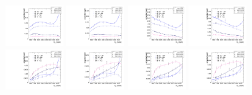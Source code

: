 \begin{figure}[htbp]
  \includegraphics[width=0.2\textwidth]{fig/analysis/paramSignalYield_VBFSig_mu_HP_vbf_DEtaLo.pdf}
  \includegraphics[width=0.2\textwidth]{fig/analysis/paramSignalYield_VBFSig_e_HP_vbf_DEtaLo.pdf}
  \includegraphics[width=0.2\textwidth]{fig/analysis/paramSignalYield_VBFSig_mu_LP_vbf_DEtaLo.pdf}
  \includegraphics[width=0.2\textwidth]{fig/analysis/paramSignalYield_VBFSig_e_LP_vbf_DEtaLo.pdf}\\
  \includegraphics[width=0.2\textwidth]{fig/analysis/paramSignalYield_VBFSig_mu_HP_bb_DEtaHi.pdf}
  \includegraphics[width=0.2\textwidth]{fig/analysis/paramSignalYield_VBFSig_e_HP_bb_DEtaHi.pdf}
  \includegraphics[width=0.2\textwidth]{fig/analysis/paramSignalYield_VBFSig_mu_LP_bb_DEtaHi.pdf}
  \includegraphics[width=0.2\textwidth]{fig/analysis/paramSignalYield_VBFSig_e_LP_bb_DEtaHi.pdf}\\

\end{figure}
